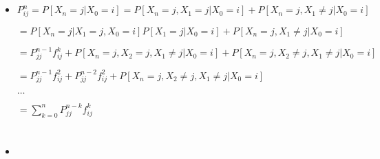 \documentclass[a4paper]{article}
\begin{document}
\section{}
\begin{itemize}
        \begin{figure} [H]
            \texttt{[image: image/4.png]}
        \end{figure}
    \item $P_{ij}^n = P[X_n = j|X_0 = i] = P[X_n = j, X_1 = j|X_0=i] + P[X_n = j, X_1 \not = j|X_0=i]$

        $= P[X_n = j|X_1 = j, X_0=i]P[X_1=j|X_0=i] + P[X_n = j, X_1 \not = j|X_0=i]$

        $= P_{jj}^{n-1} f_{ij}^k + P[X_n = j, X_2 = j, X_1 \not = j|X_0=i] + P[X_n = j, X_2 \not = j, X_1 \not = j|X_0=i]$

        $= P_{jj}^{n-1} f_{ij}^2 + P_{jj}^{n-2} f_{ij}^2 + P[X_n = j, X_2 \not = j, X_1 \not = j|X_0=i]$

        $\dots$

        $= \sum_{k=0}^n P_{jj}^{n-k} f_{ij}^k$
\end{itemize}

\section{}
\begin{itemize}
        \begin{figure} [H]
            \texttt{[image: image/5.png]}
        \end{figure}
    \item 
\end{itemize}
\end{document}
